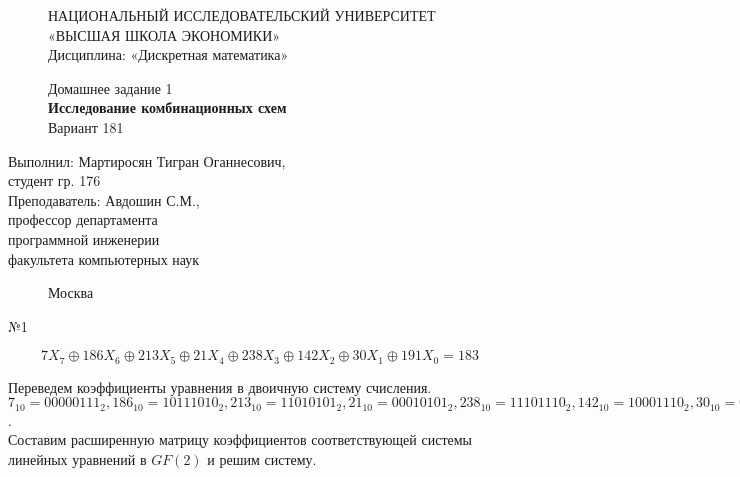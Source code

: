 \documentclass[]{article}
\begin{document}
	\begin{figure}[t]
		\centering
		\large
		НАЦИОНАЛЬНЫЙ ИССЛЕДОВАТЕЛЬСКИЙ УНИВЕРСИТЕТ\\
		«ВЫСШАЯ ШКОЛА ЭКОНОМИКИ»\\
		Дисциплина: «Дискретная математика»
	\end{figure}
	
	\begin{figure}[h]
	\vspace{3in}
	\centering
	\Large
	Домашнее задание 1\\
	\Huge
	\textbf{Исследование комбинационных схем}\\
	Вариант 181 
	\end{figure}
	
	\vspace{2in}
	\Large
	\raggedleft
	Выполнил: Мартиросян Тигран Оганнесович,\\
	студент гр. 176\\
	\vspace{12pt}
	Преподаватель: Авдошин С.М.,\\
	профессор департамента\\
	программной инженерии\\
	факультета компьютерных наук
	
	\begin{figure}[b]
		\centering
		Москва \the\year
	\end{figure}
	
	\thispagestyle{empty}
	
	\newpage
	
	\Large
	\begin{center}№1\end{center}
	
	\begin{equation*}
	7X_7 \oplus 186X_6\oplus 213X_5\oplus 21X_4\oplus 238X_3 \oplus 142X_2\oplus 30X_1 \oplus 191X_0 = 183
	\end{equation*}
	
	\raggedright
	Переведем коэффициенты уравнения в двоичную систему счисления.\\
		
	$7_{10} = 00000111_2, 186_{10} = 10111010_2, 213_{10} = 11010101_2, 21_{10} = 00010101_2, 238_{10} = 11101110_2, 142_{10} = 10001110_2, 30_{10} = 00011110_2, 191_{10} = 10111111_2, 183_{10} = 10110111_2$.\\
		
	Составим расширенную матрицу коэффициентов соответствующей системы линейных уравнений в $GF(2)$ и решим систему. 
			
\end{document}
